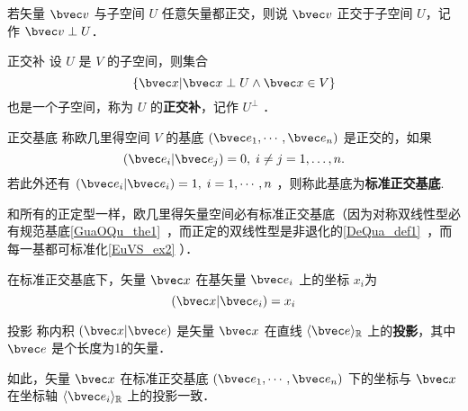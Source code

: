 若矢量 $\bvec v$ 与子空间 $U$ 任意矢量都正交，则说 $\bvec v$ 正交于子空间 $U$，记作 $\bvec v\perp U$．
\begin{definition}{正交补}
设 $U$ 是 $V$ 的子空间，则集合
\begin{equation}
\{\bvec x|\bvec x\perp U\wedge\bvec x\in V\}
\end{equation}
也是一个子空间，称为 $U$ 的\textbf{正交补}，记作 $U^{\perp}$ ．
\end{definition}
\begin{definition}{正交基底}
称欧几里得空间 $V$ 的基底 $(\bvec e_1,\cdots,\bvec e_n)$ 是正交的，如果
\begin{equation}
(\bvec e_i|\bvec e_j)=0,\;i\neq j=1,\dots,n.
\end{equation}
若此外还有 $(\bvec e_i|\bvec e_i)=1,\;i=1,\cdots ,n$ ，则称此基底为\textbf{标准正交基底}.
\end{definition}

和所有的正定型一样，欧几里得矢量空间必有标准正交基底（因为对称双线性型必有规范基底\autoref{GuaOQu_the1}~，而正定的双线性型是非退化的\autoref{DeQua_def1}~，而每一基都可标准化\autoref{EuVS_ex2} ）．
\begin{exercise}{}
在标准正交基底下，矢量 $\bvec x$ 在基矢量 $\bvec e_i$ 上的坐标 $x_i$为
\begin{equation}
(\bvec x|\bvec e_i)=x_i
\end{equation}
\end{exercise}
\begin{definition}{投影}
称内积 $(\bvec x|\bvec e)$ 是矢量 $\bvec x$ 在直线 $\langle\bvec e\rangle_{\mathbb R}$ 上的\textbf{投影}，其中 $\bvec e$ 是个长度为1的矢量．  
\end{definition}
如此，矢量 $\bvec x$ 在标准正交基底 $(\bvec e_1,\cdots,\bvec e_n)$ 下的坐标与 $\bvec x$ 在坐标轴 $\langle\bvec e_i\rangle_\mathbb{R}$ 上的投影一致． 